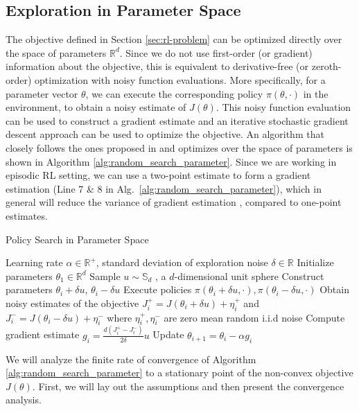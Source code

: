 \subsection{Exploration in Parameter Space}
\label{sec:parameter_space}
The objective defined in Section \ref{sec:rl-problem} can be optimized
directly over the space of parameters $\mathbb{R}^d$. Since we do not use first-order (or gradient) information about the
objective, this is equivalent to derivative-free (or zeroth-order)
optimization with noisy function evaluations. More specifically, for a parameter vector
$\theta$, we can execute the corresponding policy $\pi(\theta, \cdot)$
in the environment, to obtain a noisy estimate of $J(\theta)$. This
noisy function evaluation can be used to construct a gradient estimate
and an iterative stochastic gradient descent approach can be used to
optimize the objective. An algorithm that closely follows the ones
proposed in \citep{agarwal2010optimal, mania2018simple}
 and optimizes over the space of parameters  is shown in Algorithm
\ref{alg:random_search_parameter}. Since we are working in episodic RL setting, we can use a two-point estimate to form a gradient estimation (Line 7 \& 8 in Alg.~\ref{alg:random_search_parameter}), which in general will reduce the variance of gradient estimation \citep{agarwal2010optimal}, compared to one-point estimates.
\begin{algorithm}[ht]
\caption{Policy Search in Parameter Space}
 \label{alg:random_search_parameter}
\begin{algorithmic}[1]
   Learning rate $\alpha \in\mathbb{R}^+$, standard deviation of exploration noise $\delta\in\mathbb{R}$
  \State Initialize parameters $\theta_1\in\mathbb{R}^d$
    \State Sample $u \sim \mathbb{S}_d$ , a $d$-dimensional unit sphere
    \State Construct parameters $\theta_i + \delta u$, $\theta_i - \delta u$
    \State Execute policies $\pi({\theta_i + \delta u}, \cdot),
    \pi({\theta_i - \delta u}, \cdot)$ 
    \State Obtain noisy estimates of the objective $J^+_i = J(\theta_i
    + \delta u) + \eta^+_i$ and $J^-_i = J(\theta_i - \delta u) +
    \eta^-_i$ where $\eta^+_i, \eta^-_i$ are zero mean random i.i.d noise
    \State Compute gradient estimate $g_i = \frac{d(J^+_i - J^-_i)}{2\delta} u $
    \State Update $\theta_{i+1} = \theta_i - \alpha g_i$
  \EndFor
\end{algorithmic}
\end{algorithm}
We will analyze the finite rate of convergence of Algorithm \ref{alg:random_search_parameter} to a stationary point of the non-convex objective $J(\theta)$. First, we will lay out the assumptions and then present the convergence analysis. 
